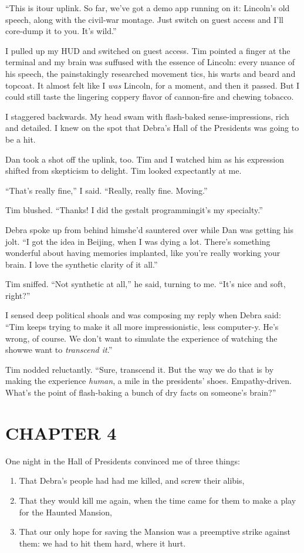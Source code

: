 “This is it{\dash}our uplink. So far, we've got a demo app running on it:
Lincoln's old speech, along with the civil-war montage. Just switch
on guest access and I'll core-dump it to you. It's wild.”

I pulled up my HUD and switched on guest access. Tim pointed a
finger at the terminal and my brain was suffused with the essence
of Lincoln: every nuance of his speech, the painstakingly
researched movement tics, his warts and beard and topcoat. It
almost felt like I \emph{was} Lincoln, for a moment, and then it
passed. But I could still taste the lingering coppery flavor of
cannon-fire and chewing tobacco.

I staggered backwards. My head swam with flash-baked
sense-impressions, rich and detailed. I knew on the spot that
Debra's Hall of the Presidents was going to be a hit.

Dan took a shot off the uplink, too. Tim and I watched him as his
expression shifted from skepticism to delight. Tim looked
expectantly at me.

“That's really fine,” I said. “Really, really fine. Moving.”

Tim blushed. “Thanks! I did the gestalt programming{\dash}it's my
specialty.”

Debra spoke up from behind him{\dash}she'd sauntered over while Dan was
getting his jolt. “I got the idea in Beijing, when I was dying a
lot. There's something wonderful about having memories implanted,
like you're really working your brain. I love the synthetic clarity
of it all.”

Tim sniffed. “Not synthetic at all,” he said, turning to me. “It's
nice and soft, right?”

I sensed deep political shoals and was composing my reply when
Debra said: “Tim keeps trying to make it all more impressionistic,
less computer-y. He's wrong, of course. We don't want to simulate
the experience of watching the show{\dash}we want to
\emph{transcend it}.”

Tim nodded reluctantly. “Sure, transcend it. But the way we do that
is by making the experience \emph{human}, a mile in the presidents'
shoes. Empathy-driven. What's the point of flash-baking a bunch of
dry facts on someone's brain?”

\section{CHAPTER 4}

One night in the Hall of Presidents convinced me of three things:
\begin{enumerate}
\item
That Debra's people had had me killed, and screw their alibis,
\item
That they would kill me again, when the time came for them to make
a play for the Haunted Mansion,
\item
That our only hope for saving the Mansion was a preemptive strike
against them: we had to hit them hard, where it hurt.
\end{enumerate}

